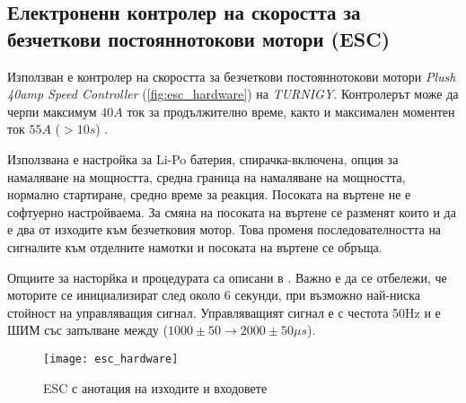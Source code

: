 \subsection{Електроненн контролер на скоростта за безчеткови постояннотокови мотори (ESC)}

Използван е контролер на скоростта за безчеткови постояннотокови мотори \textit{Plush 40amp Speed Controller} (\autoref{fig:esc_hardware}) на \textit{TURNIGY}.
Контролерът може да черпи максимум \(40A\) ток за продължително време,
както и максимален моментен ток \(55A\) (\(>10s\)) \cite{user_manual_esc}.

Използвана е настройка за Li-Po батерия,
спирачка-включена,
опция за намаляване на мощността,
средна граница на намаляване на мощността,
нормално стартиране,
средно време за реакция.
Посоката на въртене не е софтуерно настройваема.
За смяна на посоката на въртене се разменят които и да е два от изходите към безчетковия мотор.
Това променя последователността на сигналите към отделните намотки и посоката на въртене се обръща.

Опциите за насторйка и процедурата са описани в \cite{user_manual_esc}.
Важно е да се отбележи, че моторите се инициализират след около 6 секунди,
при възможно най-ниска стойност на управляващия сигнал.
Управляващият сигнал е с честота 50Hz и е ШИМ със запълване между (\(1000\pm50 \to 2000\pm50 \mu s\)).

\begin{figure}[htpb!]
    \centering
    \texttt{[image: esc\_hardware]}
    \caption{ESC с анотация на изходите и входовете}
    \label{fig:esc_hardware}
\end{figure}

\FloatBarrier
